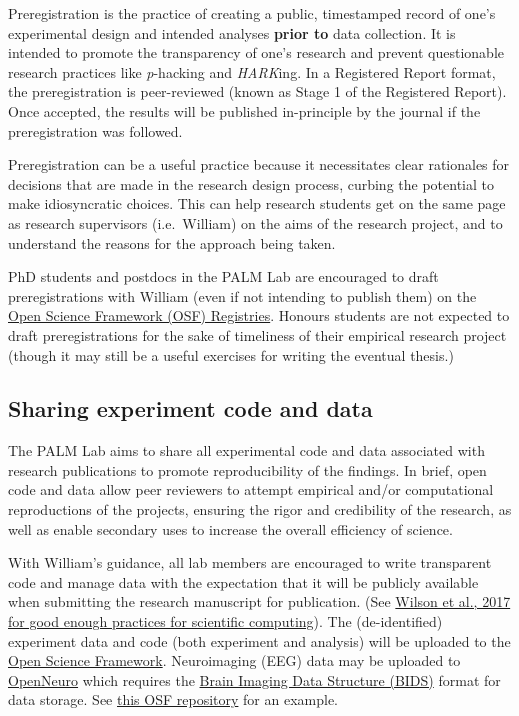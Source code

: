 \documentclass[
]{book}
\begin{document}
Preregistration is the practice of creating a public, timestamped record of one's experimental design and intended analyses \textbf{prior to} data collection. It is intended to promote the transparency of one's research and prevent questionable research practices like \emph{p}-hacking and \emph{HARK}ing. In a Registered Report format, the preregistration is peer-reviewed (known as Stage 1 of the Registered Report). Once accepted, the results will be published in-principle by the journal if the preregistration was followed.

Preregistration can be a useful practice because it necessitates clear rationales for decisions that are made in the research design process, curbing the potential to make idiosyncratic choices. This can help research students get on the same page as research supervisors (i.e.~William) on the aims of the research project, and to understand the reasons for the approach being taken.

PhD students and postdocs in the PALM Lab are encouraged to draft preregistrations with William (even if not intending to publish them) on the \href{https://osf.io/registries/osf/new}{Open Science Framework (OSF) Registries}. Honours students are not expected to draft preregistrations for the sake of timeliness of their empirical research project (though it may still be a useful exercises for writing the eventual thesis.)

\hypertarget{sharing-experiment-code-and-data}{%
\subsection{Sharing experiment code and data}\label{sharing-experiment-code-and-data}}

The PALM Lab aims to share all experimental code and data associated with research publications to promote reproducibility of the findings. In brief, open code and data allow peer reviewers to attempt empirical and/or computational reproductions of the projects, ensuring the rigor and credibility of the research, as well as enable secondary uses to increase the overall efficiency of science.

With William's guidance, all lab members are encouraged to write transparent code and manage data with the expectation that it will be publicly available when submitting the research manuscript for publication. (See \href{https://journals.plos.org/ploscompbiol/article?id=10.1371/journal.pcbi.1005510}{Wilson et al., 2017 for good enough practices for scientific computing}). The (de-identified) experiment data and code (both experiment and analysis) will be uploaded to the \href{https://osf.io}{Open Science Framework}. Neuroimaging (EEG) data may be uploaded to \href{https://openneuro.org/}{OpenNeuro} which requires the \href{https://bids.neuroimaging.io/}{Brain Imaging Data Structure (BIDS)} format for data storage. See \href{https://osf.io/wjr7u/}{this OSF repository} for an example.
\end{document}

